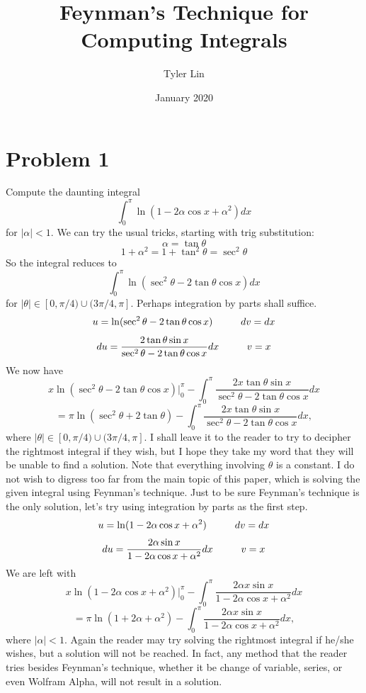 \documentclass{article}
\title{Feynman's Technique for Computing Integrals}
\author{Tyler Lin}
\date{January 2020}
\begin{document}
\maketitle

\section*{Problem 1}
Compute the daunting integral $$\int_{0}^{\pi} \ln(1-2\alpha\cos{x}+\alpha^2)dx$$ for $|\alpha|<1$.
\newline We can try the usual tricks, starting with trig substitution:
$$\alpha=\tan{\theta}$$
$$1+\alpha^2=1+\tan^2{\theta}=\sec^2{\theta}$$
So the integral reduces to $$\int_{0}^{\pi} \ln(\sec^2{\theta}-2\tan{\theta}\cos{x})dx$$ for $|\theta| \in [0,\pi/4) \cup (3\pi/4, \pi]$.
Perhaps integration by parts shall suffice.
$$u=\ln(\sec^2{\theta}-2\tan{\theta}\cos{x}) \hspace{10mm} dv=dx$$
$$du=\frac{2\tan{\theta}\sin{x}}{\sec^2{\theta}-2\tan{\theta}\cos{x}}dx \hspace{10mm} v=x$$
We now have
$$x\ln(\sec^2{\theta}-2\tan{\theta}\cos{x})\bigg\vert_{0}^{\pi} - \int_{0}^{\pi} \frac{2x\tan{\theta}\sin{x}}{\sec^2{\theta}-2\tan{\theta}\cos{x}}dx$$
$$= \pi\ln(\sec^2{\theta}+2\tan{\theta}) - \int_{0}^{\pi} \frac{2x\tan{\theta}\sin{x}}{\sec^2{\theta}-2\tan{\theta}\cos{x}}dx,$$
where $|\theta| \in [0,\pi/4) \cup (3\pi/4, \pi]$.
\newline I shall leave it to the reader to try to decipher the rightmost integral if they wish, but I hope they take my word that they will be unable to find a solution. Note that everything involving $\theta$ is a constant.
\newline I do not wish to digress too far from the main topic of this paper, which is solving the given integral using Feynman's technique. Just to be sure Feynman's technique is the only solution, let's try using integration by parts as the first step. 
$$u=\ln(1-2\alpha\cos{x}+\alpha^2) \hspace{10mm} dv=dx$$
$$du=\frac{2\alpha\sin{x}}{1-2\alpha\cos{x}+\alpha^2}dx \hspace{10mm} v=x$$
We are left with
$$x\ln(1-2\alpha\cos{x}+\alpha^2)\bigg\vert_{0}^{\pi} - \int_{0}^{\pi}\frac{2\alpha{x}\sin{x}}{1-2\alpha\cos{x}+\alpha^2}dx$$
$$= \pi\ln(1+2\alpha+\alpha^2) - \int_{0}^{\pi}\frac{2\alpha{x}\sin{x}}{1-2\alpha\cos{x}+\alpha^2}dx,$$
where $|\alpha|<1$. 
\newline Again the reader may try solving the rightmost integral if he/she wishes, but a solution will not be reached. In fact, any method that the reader tries besides Feynman's technique, whether it be change of variable, series, or even Wolfram Alpha, will not result in a solution.
\end{document}
